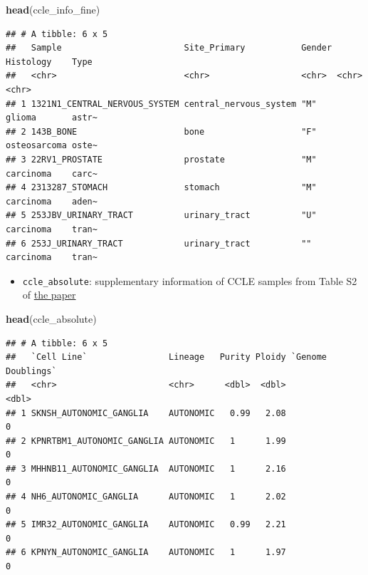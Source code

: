 \documentclass[
]{book}
\newenvironment{Shaded}{\begin{snugshade}}{\end{snugshade}}
\newcommand{\FunctionTok}[1]{\textcolor[rgb]{0.13,0.29,0.53}{\textbf{#1}}}
\newcommand{\NormalTok}[1]{#1}
\providecommand{\tightlist}{%
  \setlength{\itemsep}{0pt}\setlength{\parskip}{0pt}}
\begin{document}
\begin{Shaded}
\begin{Highlighting}[]
\FunctionTok{head}\NormalTok{(ccle\_info\_fine)}
\end{Highlighting}
\end{Shaded}

\begin{verbatim}
## # A tibble: 6 x 5
##   Sample                        Site_Primary           Gender Histology    Type 
##   <chr>                         <chr>                  <chr>  <chr>        <chr>
## 1 1321N1_CENTRAL_NERVOUS_SYSTEM central_nervous_system "M"    glioma       astr~
## 2 143B_BONE                     bone                   "F"    osteosarcoma oste~
## 3 22RV1_PROSTATE                prostate               "M"    carcinoma    carc~
## 4 2313287_STOMACH               stomach                "M"    carcinoma    aden~
## 5 253JBV_URINARY_TRACT          urinary_tract          "U"    carcinoma    tran~
## 6 253J_URINARY_TRACT            urinary_tract          ""     carcinoma    tran~
\end{verbatim}

\begin{itemize}
\tightlist
\item
  \texttt{ccle\_absolute}: supplementary information of CCLE samples from Table S2 of \href{https://www.nature.com/articles/s41586-020-03133-3\#Sec34}{the paper}
\end{itemize}

\begin{Shaded}
\begin{Highlighting}[]
\FunctionTok{head}\NormalTok{(ccle\_absolute)}
\end{Highlighting}
\end{Shaded}

\begin{verbatim}
## # A tibble: 6 x 5
##   `Cell Line`                Lineage   Purity Ploidy `Genome Doublings`
##   <chr>                      <chr>      <dbl>  <dbl>              <dbl>
## 1 SKNSH_AUTONOMIC_GANGLIA    AUTONOMIC   0.99   2.08                  0
## 2 KPNRTBM1_AUTONOMIC_GANGLIA AUTONOMIC   1      1.99                  0
## 3 MHHNB11_AUTONOMIC_GANGLIA  AUTONOMIC   1      2.16                  0
## 4 NH6_AUTONOMIC_GANGLIA      AUTONOMIC   1      2.02                  0
## 5 IMR32_AUTONOMIC_GANGLIA    AUTONOMIC   0.99   2.21                  0
## 6 KPNYN_AUTONOMIC_GANGLIA    AUTONOMIC   1      1.97                  0
\end{verbatim}
\end{document}
